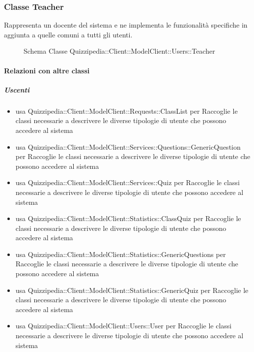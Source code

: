 \subsubsection{Classe Teacher}
Rappresenta un docente del sistema e ne implementa le funzionalità specifiche in aggiunta a quelle comuni a tutti gli utenti.
\begin{figure}[H]
\centering
\noindent{}
\caption[Schema Classe Teacher]{Schema Classe Quizzipedia::Client::ModelClient::Users::Teacher}
\end{figure}
\paragraph{Relazioni con altre classi}
\subparagraph{Uscenti}
\begin{itemize}
\item usa Quizzipedia::Client::ModelClient::Requests::ClassList per Raccoglie le classi necessarie a descrivere le diverse tipologie di utente che possono accedere al sistema
\item usa Quizzipedia::Client::ModelClient::Services::Questions::GenericQuestion per Raccoglie le classi necessarie a descrivere le diverse tipologie di utente che possono accedere al sistema
\item usa Quizzipedia::Client::ModelClient::Services::Quiz per Raccoglie le classi necessarie a descrivere le diverse tipologie di utente che possono accedere al sistema
\item usa Quizzipedia::Client::ModelClient::Statistics::ClassQuiz per Raccoglie le classi necessarie a descrivere le diverse tipologie di utente che possono accedere al sistema
\item usa Quizzipedia::Client::ModelClient::Statistics::GenericQuestions per Raccoglie le classi necessarie a descrivere le diverse tipologie di utente che possono accedere al sistema
\item usa Quizzipedia::Client::ModelClient::Statistics::GenericQuiz per Raccoglie le classi necessarie a descrivere le diverse tipologie di utente che possono accedere al sistema
\item usa Quizzipedia::Client::ModelClient::Users::User per Raccoglie le classi necessarie a descrivere le diverse tipologie di utente che possono accedere al sistema
\end{itemize}
